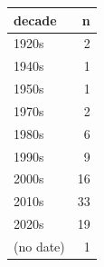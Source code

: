 \begin{tabular}{lr}
\toprule
decade & n \\
\midrule
1920s & 2 \\
1940s & 1 \\
1950s & 1 \\
1970s & 2 \\
1980s & 6 \\
1990s & 9 \\
2000s & 16 \\
2010s & 33 \\
2020s & 19 \\
(no date) & 1 \\
\bottomrule
\end{tabular}

